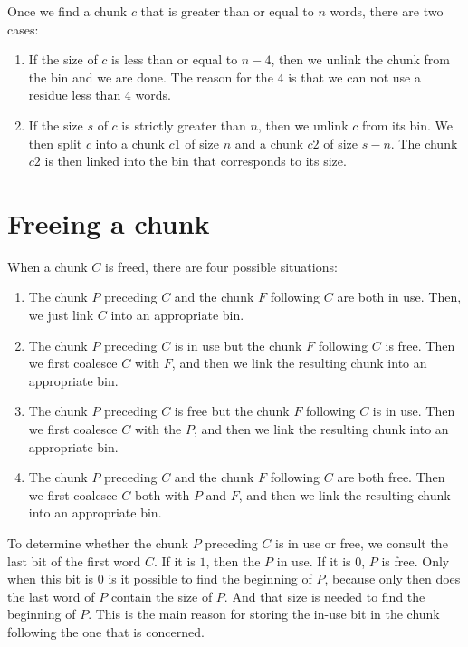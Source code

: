 Once we find a chunk $c$ that is greater than or equal to $n$ words,
there are two cases:

\begin{enumerate}
\item If the size of $c$ is less than or equal to $n-4$, then we
  unlink the chunk from the bin and we are done.  The reason for the
  $4$ is that we can not use a residue less than $4$ words.
\item If the size $s$ of $c$ is strictly greater than $n$, then we
  unlink $c$ from its bin.  We then split $c$ into a chunk $c1$ of
  size $n$ and a chunk $c2$ of size $s-n$.  The chunk $c2$ is then
  linked into the bin that corresponds to its size.
\end{enumerate}

\section{Freeing a chunk}

When a chunk $C$ is freed, there are four possible situations:

\begin{enumerate}
\item The chunk $P$ preceding $C$ and the chunk $F$ following $C$
  are both in use.  Then, we just link $C$ into an appropriate
  bin.
\item The chunk $P$ preceding $C$ is in use but the chunk $F$
  following $C$ is free.  Then we first coalesce $C$ with $F$, and
  then we link the resulting chunk into an appropriate bin.
\item The chunk $P$ preceding $C$ is free but the chunk $F$ following
  $C$ is in use.  Then we first coalesce $C$ with the $P$, and then we
  link the resulting chunk into an appropriate bin.
\item The chunk $P$ preceding $C$ and the chunk $F$ following $C$ are
  both free.  Then we first coalesce $C$ both with $P$ and $F$, and
  then we link the resulting chunk into an appropriate bin.
\end{enumerate}

To determine whether the chunk $P$ preceding $C$ is in use or free, we
consult the last bit of the first word $C$.  If it is $1$, then the
$P$ in use.  If it is $0$, $P$ is free.  Only when this bit is $0$ is
it possible to find the beginning of $P$, because only then does the
last word of $P$ contain the size of $P$.  And that size is needed to
find the beginning of $P$.  This is the main reason for storing the
in-use bit in the chunk following the one that is concerned.

